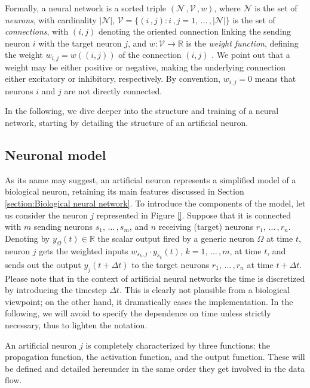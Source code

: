 \documentclass[11pt, a4paper]{report}
\theoremstyle{theorem}
\numberwithin{equation}{section}
\numberwithin{figure}{section}
\begin{document}
		Formally, a neural network is a sorted triple $\left( \mathcal{N} \, , \mathcal{V} \, , w \right)$, where $\mathcal{N}$ is the set of \emph{neurons}, with cardinality $|\mathcal{N}|$, $\mathcal{V} = \lbrace (i \, , j): i \, , j  = 1, \, \ldots \, , |\mathcal{N}| \rbrace$ is the set of \emph{connections}, with $(i,j)$ denoting the oriented connection linking the sending neuron $i$ with the target neuron $j$, and $w : \mathcal{V} \rightarrow \mathbb{R}$ is the \emph{weight function}, defining the weight $w_{i,j} = w((i,j))$ of the connection $(i,j)$ \cite{Kri}. We point out that a weight may be either positive or negative, making the underlying connection either excitatory or inhibitory, respectively. By convention, $w_{i,j} = 0$ means that neurons $i$ and $j$ are not directly connected.
		
		In the following, we dive deeper into the structure and training of a neural network, starting by detailing the structure of an artificial neuron.  
														
	\subsection{Neuronal model}
	\label{section:Neuronal model}
	
		As its name may suggest, an artificial neuron represents a simplified model of a biological neuron, retaining its main features discussed in Section \ref{section:Biological neural network}. To introduce the components of the model, let us consider the neuron $j$ represented in Figure \ref{}. Suppose that it is connected with $m$ sending neurons $s_1, \, \ldots \, , s_m$, and $n$ receiving (target) neurons $r_1, \, \ldots \, , r_n$. Denoting by $y_{\Omega}(t) \in \mathbb{R}$ the scalar output fired by a generic neuron $\Omega$ at time $t$, neuron $j$ gets the weighted inputs $w_{s_k,j} \cdot y_{s_k}(t)$, $k = 1, \, \ldots \, , m$, at time $t$, and sends out the output $y_j(t + \Delta t)$ to the target neurons $r_1, \, \ldots \, , r_n$ at time $t + \Delta t$. Please note that in the context of artificial neural networks the time is discretized by introducing the timestep $\Delta t$. This is clearly not plausible from a biological viewpoint; on the other hand, it dramatically eases the implementation. In the following, we will avoid to specify the dependence on time unless strictly necessary, thus to lighten the notation.
		
		An artificial neuron $j$ is completely characterized by three functions: the propagation function, the activation function, and the output function. These will be defined and detailed hereunder in the same order they get involved in the data flow. 
		
\end{document}
